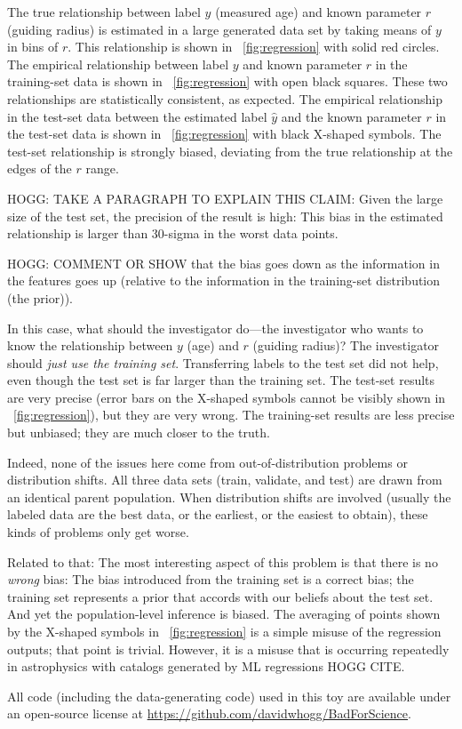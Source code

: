\documentclass[10pt]{article}
\begin{document}
The true relationship between label $y$ (measured age) and known parameter $r$ (guiding radius) is estimated in a large generated data set by taking means of $y$ in bins of $r$.
This relationship is shown in \figurename~\ref{fig:regression} with solid red circles.
The empirical relationship between label $y$ and known parameter $r$ in the training-set data is shown in \figurename~\ref{fig:regression} with open black squares.
These two relationships are statistically consistent, as expected.
The empirical relationship in the test-set data between the estimated label $\hat{y}$ and the known parameter $r$ in the test-set data is shown in \figurename~\ref{fig:regression} with black X-shaped symbols.
The test-set relationship is strongly biased, deviating from the true relationship at the edges of the $r$ range.

HOGG: TAKE A PARAGRAPH TO EXPLAIN THIS CLAIM: Given the large size of the test set, the precision of the result is high: This bias in the estimated relationship is larger than 30-sigma in the worst data points.

HOGG: COMMENT OR SHOW that the bias goes down as the information in the features goes up (relative to the information in the training-set distribution (the prior)).

In this case, what should the investigator do---the investigator who wants to know the relationship between $y$ (age) and $r$ (guiding radius)?
The investigator should \emph{just use the training set}.
Transferring labels to the test set did not help, even though the test set is far larger than the training set.
The test-set results are very precise (error bars on the X-shaped symbols cannot be visibly shown in \figurename~\ref{fig:regression}), but they are very wrong.
The training-set results are less precise but unbiased; they are much closer to the truth.

Indeed, none of the issues here come from out-of-distribution problems or distribution shifts.
All three data sets (train, validate, and test) are drawn from an identical parent population.
When distribution shifts are involved (usually the labeled data are the best data, or the earliest, or the easiest to obtain), these kinds of problems only get worse.

Related to that: The most interesting aspect of this problem is that there is no \emph{wrong} bias:
The bias introduced from the training set is a correct bias; the training set represents a prior that accords with our beliefs about the test set.
And yet the population-level inference is biased.
The averaging of points shown by the X-shaped symbols in \figurename~\ref{fig:regression} is a simple misuse of the regression outputs; that point is trivial.
However, it is a misuse that is occurring repeatedly in astrophysics with catalogs generated by ML regressions HOGG CITE.

All code (including the data-generating code) used in this toy are available under an open-source license at \url{https://github.com/davidwhogg/BadForScience}.
\end{document}
